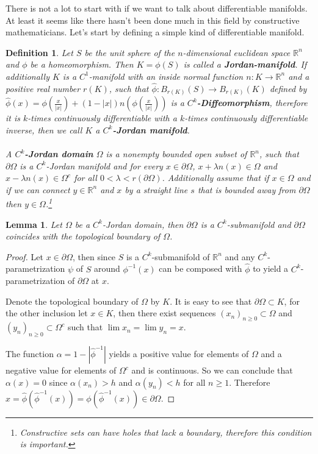 \documentclass[11pt,a4paper,leqno]{report}
\newtheorem{lemma}[theorem]{Lemma}
\newtheorem{definition}[theorem]{Definition}
\numberwithin{equation}{chapter}
\begin{document}
There is not a lot to start with if we want to talk about differentiable manifolds. At least it seems like there hasn't been done much in this field by constructive mathematicians. Let's start by defining a simple kind of differentiable manifold. 
\begin{definition} Let $S$ be the unit sphere of the $n$-dimensional euclidean space $\mathbb{R}^n$ and $\phi$ be a homeomorphism. Then $K=\phi(S)$ is called a \textbf{Jordan-manifold}. If additionally $K$ is a $C^1$-manifold with an inside normal function $n:K\rightarrow\mathbb{R}^n$ and a positive real number $r(K)$, such that $\hat{\phi}:B_{r(K)}(S)\rightarrow B_{r(K)}(K)$ defined by $\hat{\phi}(x)=\phi(\frac{x}{|x|})+(1-|x|)n(\phi(\frac{x}{|x|}))$ is a \textbf{$C^k$-Diffeomorphism}, therefore it is $k$-times continuously differentiable with a $k$-times continuously differentiable inverse, then we call $K$ a \textbf{$C^k$-Jordan manifold}.\\
\\
A \textbf{$C^k$-Jordan domain} $\Omega$ is a nonempty bounded open subset of $\mathbb{R}^n$, such that $\partial\Omega$ is a $C^k$-Jordan manifold and for every $x\in\partial\Omega$, $x+\lambda n(x)\in\Omega$ and $x-\lambda n(x)\in\Omega^c$ for all $0<\lambda<r(\partial\Omega)$. Additionally assume that if $x\in\Omega$ and if we can connect $y\in\mathbb{R}^n$ and $x$ by a straight line $s$ that is bounded away from $\partial\Omega$ then $y\in\Omega$.\footnote{Constructive sets can have holes that lack a boundary, therefore this condition is important.}
\end{definition}
\begin{lemma} Let $\Omega$ be a $C^k$-Jordan domain, then $\partial\Omega$ is a $C^k$-submanifold and $\partial\Omega$ coincides with the topological boundary of $\Omega$.
\end{lemma}
\begin{proof}
Let $x\in\partial\Omega$, then since $S$ is a $C^k$-submanifold of $\mathbb{R}^n$ and any $C^k$-parametrization $\psi$ of $S$ around $\phi^{-1}(x)$ can be composed with $\hat{\phi}$ to yield a $C^k$-parametrization of $\partial\Omega$ at $x$.

Denote the topological boundary of $\Omega$ by $K$. It is easy to see that $\partial\Omega\subset K$, for the other inclusion let $x\in K$,  then there exist sequences $(x_n)_{n\geq 0}\subset\Omega$ and $(y_n)_{n\geq 0}\subset\Omega^c$ such that $\lim x_n=\lim y_n=x$. 

The function $\alpha=1-|\hat{\phi}^{-1}|$ yields a positive value for elements of $\Omega$ and a negative value for elements of $\Omega^c$ and is continuous. So we can conclude that $\alpha(x)=0$ since $\alpha(x_n)>h$ and $\alpha(y_n)<h$ for all $n\geq 1$. Therefore $x=\hat{\phi}(\hat{\phi}^{-1}(x))=\phi(\hat{\phi}^{-1}(x))\in\partial\Omega$.
\end{proof}
\end{document}
